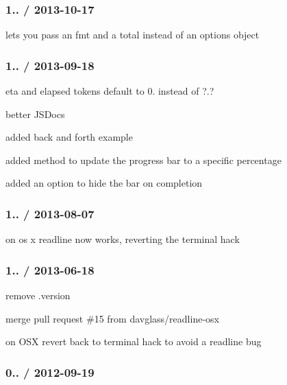 \subsubsection*{1.. / 2013-\/10-\/17}


\begin{DoxyItemize}
\item lets you pass an {\ttfamily fmt} and a {\ttfamily total} instead of an options object
\end{DoxyItemize}

\subsubsection*{1.. / 2013-\/09-\/18}


\begin{DoxyItemize}
\item eta and elapsed tokens default to 0. instead of ?.?
\item better J\+S\+Docs
\item added back and forth example
\item added method to update the progress bar to a specific percentage
\item added an option to hide the bar on completion
\end{DoxyItemize}

\subsubsection*{1.. / 2013-\/08-\/07}


\begin{DoxyItemize}
\item on os x readline now works, reverting the terminal hack
\end{DoxyItemize}

\subsubsection*{1.. / 2013-\/06-\/18}


\begin{DoxyItemize}
\item remove .version
\item merge pull request \#15 from davglass/readline-\/osx
\item on O\+S\+X revert back to terminal hack to avoid a readline bug
\end{DoxyItemize}

\subsubsection*{0.. / 2012-\/09-\/19}


